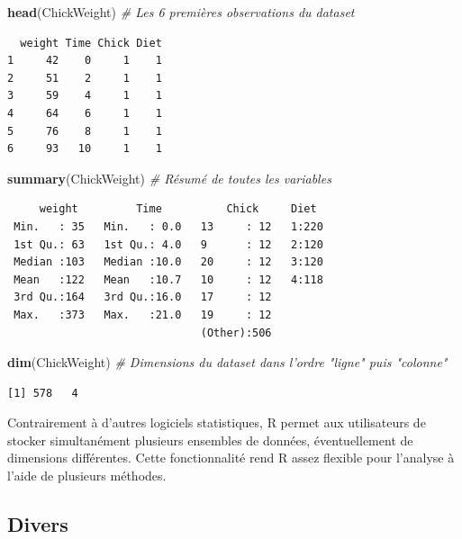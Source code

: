\documentclass[12pt,]{book}
\newenvironment{Shaded}{\begin{snugshade}}{\end{snugshade}}
\newcommand{\CommentTok}[1]{\textcolor[rgb]{0.56,0.35,0.01}{\textit{#1}}}
\newcommand{\KeywordTok}[1]{\textcolor[rgb]{0.13,0.29,0.53}{\textbf{#1}}}
\newcommand{\NormalTok}[1]{#1}
\begin{document}
\begin{Shaded}
\begin{Highlighting}[]
\KeywordTok{head}\NormalTok{(ChickWeight) }\CommentTok{# Les 6 premières observations du dataset}
\end{Highlighting}
\end{Shaded}

\begin{verbatim}
  weight Time Chick Diet
1     42    0     1    1
2     51    2     1    1
3     59    4     1    1
4     64    6     1    1
5     76    8     1    1
6     93   10     1    1
\end{verbatim}

\begin{Shaded}
\begin{Highlighting}[]
\KeywordTok{summary}\NormalTok{(ChickWeight) }\CommentTok{# Résumé de toutes les variables}
\end{Highlighting}
\end{Shaded}

\begin{verbatim}
     weight         Time          Chick     Diet   
 Min.   : 35   Min.   : 0.0   13     : 12   1:220  
 1st Qu.: 63   1st Qu.: 4.0   9      : 12   2:120  
 Median :103   Median :10.0   20     : 12   3:120  
 Mean   :122   Mean   :10.7   10     : 12   4:118  
 3rd Qu.:164   3rd Qu.:16.0   17     : 12          
 Max.   :373   Max.   :21.0   19     : 12          
                              (Other):506          
\end{verbatim}

\begin{Shaded}
\begin{Highlighting}[]
\KeywordTok{dim}\NormalTok{(ChickWeight) }\CommentTok{# Dimensions du dataset dans l'ordre "ligne" puis "colonne"}
\end{Highlighting}
\end{Shaded}

\begin{verbatim}
[1] 578   4
\end{verbatim}

Contrairement à d'autres logiciels statistiques, R permet aux utilisateurs de stocker simultanément plusieurs ensembles de données, éventuellement de dimensions différentes. Cette fonctionnalité rend R assez flexible pour l'analyse à l'aide de plusieurs méthodes.

\hypertarget{divers}{%
\subsection{Divers}\label{divers}}
\end{document}
